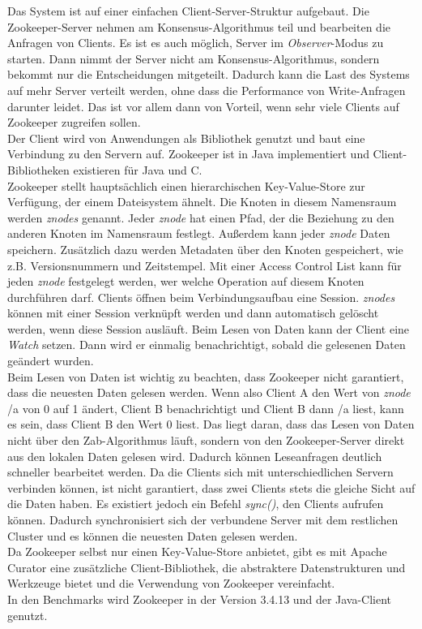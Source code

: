 Das System ist auf einer einfachen Client-Server-Struktur aufgebaut. Die Zookeeper-Server nehmen am Konsensus-Algorithmus teil und bearbeiten die Anfragen von Clients. Es ist es auch möglich, Server im \textit{Observer}-Modus zu starten. Dann nimmt der Server nicht am Konsensus-Algorithmus, sondern bekommt nur die Entscheidungen mitgeteilt. Dadurch kann die Last des Systems auf mehr Server verteilt werden, ohne dass die Performance von Write-Anfragen darunter leidet. Das ist vor allem dann von Vorteil, wenn sehr viele Clients auf Zookeeper zugreifen sollen. \\
Der Client wird von Anwendungen als Bibliothek genutzt und baut eine Verbindung zu den Servern auf. Zookeeper ist in Java implementiert und Client-Bibliotheken existieren für Java und C. \\
Zookeeper stellt hauptsächlich einen hierarchischen Key-Value-Store zur Verfügung, der einem Dateisystem ähnelt. Die Knoten in diesem Namensraum werden \textit{znodes} genannt. Jeder \textit{znode} hat einen Pfad, der die Beziehung zu den anderen Knoten im Namensraum festlegt. Außerdem kann jeder \textit{znode} Daten speichern. Zusätzlich dazu werden Metadaten über den Knoten gespeichert, wie z.B. Versionsnummern und Zeitstempel. Mit einer Access Control List kann für jeden \textit{znode} festgelegt werden, wer welche Operation auf diesem Knoten durchführen darf. Clients öffnen beim Verbindungsaufbau eine Session. \textit{znodes} können mit einer Session verknüpft werden und dann automatisch gelöscht werden, wenn diese Session ausläuft. Beim Lesen von Daten kann der Client eine \textit{Watch} setzen. Dann wird er einmalig benachrichtigt, sobald die gelesenen Daten geändert wurden.\\
Beim Lesen von Daten ist wichtig zu beachten, dass Zookeeper nicht garantiert, dass die neuesten Daten gelesen werden. Wenn also Client A den Wert von \textit{znode} /a von 0 auf 1 ändert, Client B benachrichtigt und Client B dann /a liest, kann es sein, dass Client B den Wert 0 liest. Das liegt daran, dass das Lesen von Daten nicht über den Zab-Algorithmus läuft, sondern von den Zookeeper-Server direkt aus den lokalen Daten gelesen wird. Dadurch können Leseanfragen deutlich schneller bearbeitet werden. Da die Clients sich mit unterschiedlichen Servern verbinden können, ist nicht garantiert, dass zwei Clients stets die gleiche Sicht auf die Daten haben. Es existiert jedoch ein Befehl \textit{sync()}, den Clients aufrufen können. Dadurch synchronisiert sich der verbundene Server mit dem restlichen Cluster und es können die neuesten Daten gelesen werden. \\
Da Zookeeper selbst nur einen Key-Value-Store anbietet, gibt es mit Apache Curator \cite{curator} eine zusätzliche Client-Bibliothek, die abstraktere Datenstrukturen und Werkzeuge bietet und die Verwendung von Zookeeper vereinfacht. \\
In den Benchmarks wird Zookeeper in der Version 3.4.13 und der Java-Client genutzt.

